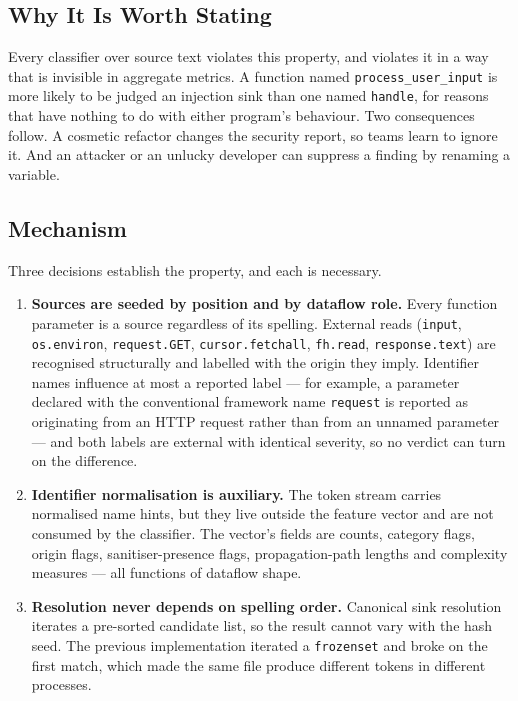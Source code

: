 \documentclass[12pt,a4paper]{article}
\begin{document}
\subsection{Why It Is Worth Stating}

Every classifier over source text violates this property, and violates it in a
way that is invisible in aggregate metrics. A function named
\texttt{process\_user\_input} is more likely to be judged an injection sink than
one named \texttt{handle}, for reasons that have nothing to do with either
program's behaviour. Two consequences follow. A cosmetic refactor changes the
security report, so teams learn to ignore it. And an attacker or an unlucky
developer can suppress a finding by renaming a variable.

\subsection{Mechanism}

Three decisions establish the property, and each is necessary.

\begin{enumerate}
    \item \textbf{Sources are seeded by position and by dataflow role.} Every
    function parameter is a source regardless of its spelling. External reads
    (\texttt{input}, \texttt{os.environ}, \texttt{request.GET},
    \texttt{cursor.fetchall}, \texttt{fh.read}, \texttt{response.text}) are
    recognised structurally and labelled with the origin they imply. Identifier
    names influence at most a reported label --- for example, a parameter
    declared with the conventional framework name \texttt{request} is reported as
    originating from an HTTP request rather than from an unnamed parameter --- and
    both labels are external with identical severity, so no verdict can turn on
    the difference.
    \item \textbf{Identifier normalisation is auxiliary.} The token stream carries
    normalised name hints, but they live outside the feature vector and are not
    consumed by the classifier. The vector's fields are counts, category flags,
    origin flags, sanitiser-presence flags, propagation-path lengths and
    complexity measures --- all functions of dataflow shape.
    \item \textbf{Resolution never depends on spelling order.} Canonical sink
    resolution iterates a pre-sorted candidate list, so the result cannot vary
    with the hash seed. The previous implementation iterated a
    \texttt{frozenset} and broke on the first match, which made the same file
    produce different tokens in different processes.
\end{enumerate}
\end{document}
